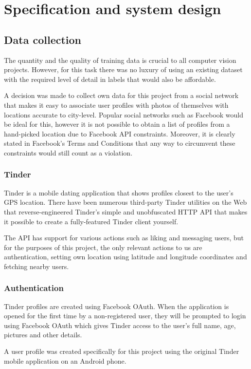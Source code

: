 \chapter{Specification and system design}
\label{spec}
\section{Data collection}
The quantity and the quality of training data is crucial to all computer vision 
projects. However, for this task there was no luxury of using an existing 
dataset with the required level of detail in labels that would also be 
affordable.

A decision was made to collect own data for this project from a social network 
that makes it easy to associate user profiles with photos of themselves with 
locations accurate to city-level. Popular social networks such as Facebook 
would be ideal for this, however it is not possible to obtain a list of 
profiles from a hand-picked location due to Facebook API constraints. 
Moreover, it is clearly stated in Facebook's Terms and Conditions that any way 
to circumvent these constraints would still count as a violation.


\subsection{Tinder}
Tinder is a mobile dating application that shows profiles closest to the 
user's GPS location. There have been numerous third-party Tinder utilities on 
the Web that reverse-engineered Tinder's simple and unobfuscated HTTP API that 
makes it possible to create a fully-featured Tinder client yourself.

The API has support for various actions such as liking and messaging users, 
but for the purposes of this project, the only relevant actions to us are 
authentication, setting own location using latitude and longitude coordinates 
and fetching nearby users.


\subsection{Authentication}
Tinder profiles are created using Facebook OAuth. When the application is 
opened for the first time by a non-registered user, they will be prompted to 
login using Facebook OAuth which gives Tinder access to the user's full name, 
age, pictures and other details.

A user profile was created specifically for this project using the original 
Tinder mobile application on an Android phone. 

